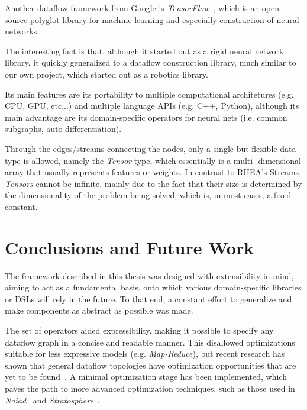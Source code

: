 \documentclass[sigplan,review,anonymous]{acmart}
\begin{document}

Another dataflow framework from Google is
\textit{TensorFlow}~\cite{tensorflow}, which is an open-source
polyglot library for machine learning and especially construction of neural
networks.

The interesting fact is that, although it started out as a rigid neural network
library, it quickly generalized to a dataflow construction library, much similar
to our own project, which started out as a robotics library.

Its main features are its portability to multiple computational architetures
(e.g. CPU, GPU, etc...) and multiple language APIs (e.g. C++, Python), although
its main advantage are its domain-specific operators for neural nets (i.e.
common subgraphs, auto-differentiation).

Through the edges/streams connecting the nodes, only a single but flexible data
type is allowed, namely the \textit{Tensor} type, which essentially is a multi-
dimensional array that usually represents features or weights. In contrast to
\textsc{RHEA}'s Streams, \textit{Tensors} cannot be infinite, mainly due to the
fact that their size is determined by the dimensionality of the problem being
solved, which is, in most cases, a fixed constant.

\section{Conclusions and Future Work} \label{sec:conclusions}

The framework described in this thesis was designed with extensibility in mind,
aiming to act as a fundamental basis, onto which various domain-specific
libraries or DSLs will rely in the future. To that end, a constant effort to
generalize and make components as abstract as possible was made.

The set of operators aided expressibility, making it possible to specify any
dataflow graph in a concise and readable manner. This disallowed optimizations
suitable for less expressive models (e.g. \textit{Map-Reduce}), but recent
research has shown that general dataflow topologies have optimization
opportunities that are yet to be found~\cite{blackbox}. A minimal optimization
stage has been implemented, which paves the path to more advanced optimization
techniques, such as those used in \textit{Naiad}~\cite{naiad} and
\textit{Stratosphere}~\cite{static_analysis}.
\end{document}
